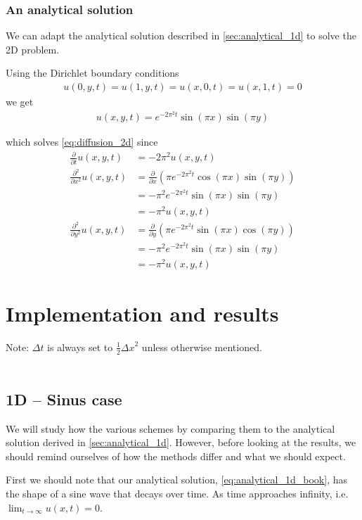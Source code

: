 \documentclass[10pt,a4paper]{article}
\newcommand{\dt}{{\Delta t}}
\newcommand{\dx}{{\Delta x}}
\newcommand{\fracpt}{\frac{\partial}{\partial t}}
\newcommand{\fracpx}{\frac{\partial}{\partial x}}
\newcommand{\fracpy}{\frac{\partial}{\partial y}}
\newcommand{\fracpxx}{\frac{\partial^2}{\partial x^2}}
\newcommand{\fracpyy}{\frac{\partial^2}{\partial y^2}}
\begin{document}
\subsubsection{An analytical solution}
We can adapt the analytical solution described in \vref{sec:analytical_1d} to solve the 2D problem.

Using the Dirichlet boundary conditions
\begin{align}
u(0, y, t) = u(1, y, t) = u(x, 0, t) = u(x, 1, t) = 0
\end{align}
we get
\begin{align}\label{eq:analytical_2d}
    u(x, y, t) = e^{-2\pi^2 t} \sin(\pi x) \sin(\pi y)
\end{align}

which solves \vref{eq:diffusion_2d} since
\begin{align}
\fracpt u(x, y, t) &= -2\pi^2 u(x, y, t) \\
\fracpxx u(x, y, t) &= \fracpx \left( \pi e^{-2\pi^2 t} \cos(\pi x) \sin(\pi y) \right) \\
&= -\pi^2 e^{-2\pi^2 t} \sin(\pi x) \sin(\pi y) \\
&= -\pi^2 u(x, y, t) \\
\fracpyy u(x, y, t) &= \fracpy \left( \pi e^{-2\pi^2 t} \sin(\pi x) \cos(\pi y) \right) \\
&= -\pi^2 e^{-2\pi^2 t} \sin(\pi x) \sin(\pi y) \\
&= -\pi^2 u(x, y, t)
\end{align}



\section{Implementation and results}\label{sec:implementation_and_results}
Note: $\dt$ is always set to $\frac{1}{2}\dx^2$ unless otherwise mentioned.\\\\

\subsection{1D -- Sinus case}
We will study how the various schemes by comparing them to the analytical solution derived in \ref{sec:analytical_1d}. However, before looking at the results, we should remind ourselves of how the methods differ and what we should expect.

First we should note that our analytical solution, \ref{eq:analytical_1d_book}, has the shape of a sine wave that decays over time. As time approaches infinity, i.e. $\lim_{t \to \infty} u(x, t) = 0$.
\end{document}
